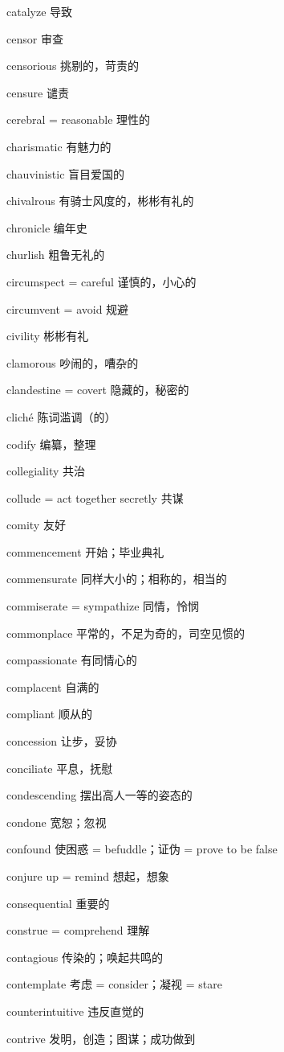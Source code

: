 \documentclass[UTF8, fontset = none, zihao = -4, linespread = 1.1]{ctexart}
\begin{document}
\begin{multicols}{2}
catalyze 导致

censor 审查

censorious 挑剔的，苛责的

censure 谴责

cerebral = reasonable 理性的

charismatic 有魅力的

chauvinistic 盲目爱国的

chivalrous 有骑士风度的，彬彬有礼的

chronicle 编年史

churlish 粗鲁无礼的

circumspect = careful 谨慎的，小心的

circumvent = avoid 规避

civility 彬彬有礼

clamorous 吵闹的，嘈杂的

clandestine = covert 隐藏的，秘密的

clich\'{e} 陈词滥调（的）

codify 编纂，整理

collegiality 共治

collude = act together secretly 共谋

comity 友好

commencement 开始；毕业典礼 

commensurate 同样大小的；相称的，相当的

commiserate = sympathize 同情，怜悯

commonplace 平常的，不足为奇的，司空见惯的

compassionate 有同情心的

complacent 自满的

compliant 顺从的

concession 让步，妥协

conciliate 平息，抚慰

condescending 摆出高人一等的姿态的

condone 宽恕；忽视

confound 使困惑 = befuddle；证伪 = prove to be false

conjure up = remind 想起，想象

consequential 重要的

construe = comprehend 理解

contagious 传染的；唤起共鸣的

contemplate 考虑 = consider；凝视 = stare

counterintuitive 违反直觉的

contrive 发明，创造；图谋；成功做到


\end{multicols}
\end{document}
